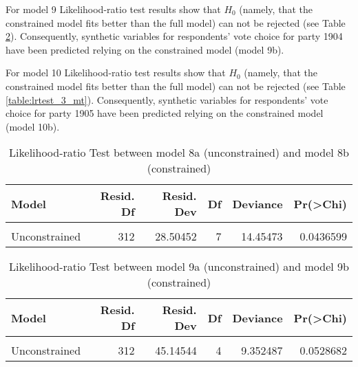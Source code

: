 \documentclass[
]{article}
\begin{document}
For model 9 Likelihood-ratio test results show that \(H_0\) (namely, that the constrained model fits better than the full model) can not be rejected (see Table \ref{table:lrtest_2_mt}). Consequently, synthetic variables for respondents' vote choice for party 1904 have been predicted relying on the constrained model (model 9b).

For model 10 Likelihood-ratio test results show that \(H_0\) (namely, that the constrained model fits better than the full model) can not be rejected (see Table \ref{table:lrtest_3_mt}). Consequently, synthetic variables for respondents' vote choice for party 1905 have been predicted relying on the constrained model (model 10b).

\begin{table}[!h]

\caption{\label{tab:unnamed-chunk-124}Likelihood-ratio Test between model 8a (unconstrained) and model 8b (constrained)
                  \label{table:lrtest_1_mt}}
\centering
\begin{tabular}[t]{l|r|r|r|r|r}
\hline
Model & Resid. Df & Resid. Dev & Df & Deviance & Pr(>Chi)\\
\hline
\cellcolor{gray!6}{Constrained} & \cellcolor{gray!6}{319} & \cellcolor{gray!6}{42.95925} & \cellcolor{gray!6}{} & \cellcolor{gray!6}{} & \cellcolor{gray!6}{}\\
\hline
Unconstrained & 312 & 28.50452 & 7 & 14.45473 & 0.0436599\\
\hline
\end{tabular}
\end{table}

\begin{table}[!h]

\caption{\label{tab:unnamed-chunk-124}Likelihood-ratio Test between model 9a (unconstrained) and model 9b (constrained)
                  \label{table:lrtest_2_mt}}
\centering
\begin{tabular}[t]{l|r|r|r|r|r}
\hline
Model & Resid. Df & Resid. Dev & Df & Deviance & Pr(>Chi)\\
\hline
\cellcolor{gray!6}{Constrained} & \cellcolor{gray!6}{316} & \cellcolor{gray!6}{54.49792} & \cellcolor{gray!6}{} & \cellcolor{gray!6}{} & \cellcolor{gray!6}{}\\
\hline
Unconstrained & 312 & 45.14544 & 4 & 9.352487 & 0.0528682\\
\hline
\end{tabular}
\end{table}
\end{document}
